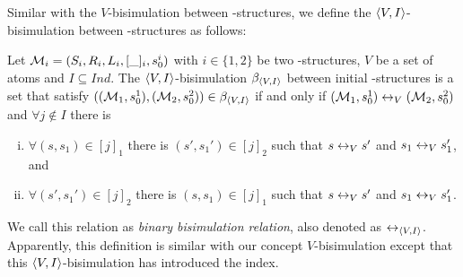 \documentclass{article}
\begin{document}
Similar with the $V$-bisimulation between \MPK-structures, we define the ${\langle{V,I}\rangle}$-bisimulation between \Ind-structures as follows:
\begin{definition} \label{def:VInd:bisimulation}
Let ${\cal M}_i=(S_i, R_i, L_i, [\_]_i, s_0^i)$ with $i\in \{1, 2\}$ be two \Ind-structures, $V$ be a set of atoms and $I \subseteq Ind$. The ${\langle{V,I}\rangle}$-bisimulation $\beta_{{\langle{V,I}\rangle}}$ between initial \Ind-structures is a set that satisfy $(({\cal M}_1, s_0^1), ({\cal M}_2, s_0^2)) \in \beta_{{\langle{V,I}\rangle}}$  if and only if $({\cal M}_1, s_0^1) \leftrightarrow_V ({\cal M}_2, s_0^2)$ and $\forall j \notin I$ there is
\begin{enumerate}[(i)]
  \item $\forall (s, s_1)\in [j]_1$ there is $(s',s_1')\in [j]_2$ such that $s\leftrightarrow_V s'$ and $s_1 \leftrightarrow_V s_1'$, and
  \item $\forall (s', s_1')\in [j]_2$ there is $(s,s_1)\in [j]_1$ such that $s\leftrightarrow_V s'$ and $s_1 \leftrightarrow_V s_1'$.
\end{enumerate}
\end{definition}
We call this relation as \emph{binary bisimulation relation}, also denoted as $\leftrightarrow_{{\langle{V,I}\rangle}}$. Apparently, this definition is similar with our concept $V$-bisimulation except that this ${\langle{V,I}\rangle}$-bisimulation has introduced the index.
\end{document}
